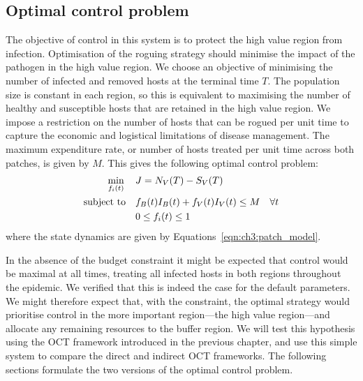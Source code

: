 \subsection{Optimal control problem}

The objective of control in this system is to protect the high value region from infection. Optimisation of the roguing strategy should minimise the impact of the pathogen in the high value region. We choose an objective of minimising the number of infected and removed hosts at the terminal time $T$. The population size is constant in each region, so this is equivalent to maximising the number of healthy and susceptible hosts that are retained in the high value region. We impose a restriction on the number of hosts that can be rogued per unit time to capture the economic and logistical limitations of disease management. The maximum expenditure rate, or number of hosts treated per unit time across both patches, is given by $M$. This gives the following optimal control problem:
\begin{subequations}\label{eqn:ch3:opt_problem}
    \begin{align}
        \min_{f_i(t)} \quad{} &\null J = N_V(T) - S_V(T) \label{eqn:ch3:opt_problem_a}\\
        \text{subject to} \quad{} &\null f_B(t)I_B(t) + f_V(t)I_V(t) \leq M \quad \forall t \label{eqn:ch3:opt_problem_b}\\
        &\null 0\leq f_i(t) \leq 1\label{eqn:ch3:opt_problem_c}
    \end{align}
\end{subequations}
where the state dynamics are given by Equations~\ref{eqn:ch3:patch_model}.

In the absence of the budget constraint it might be expected that control would be maximal at all times, treating all infected hosts in both regions throughout the epidemic. We verified that this is indeed the case for the default parameters. We might therefore expect that, with the constraint, the optimal strategy would prioritise control in the more important region---the high value region---and allocate any remaining resources to the buffer region. We will test this hypothesis using the OCT framework introduced in the previous chapter, and use this simple system to compare the direct and indirect OCT frameworks. The following sections formulate the two versions of the optimal control problem.

